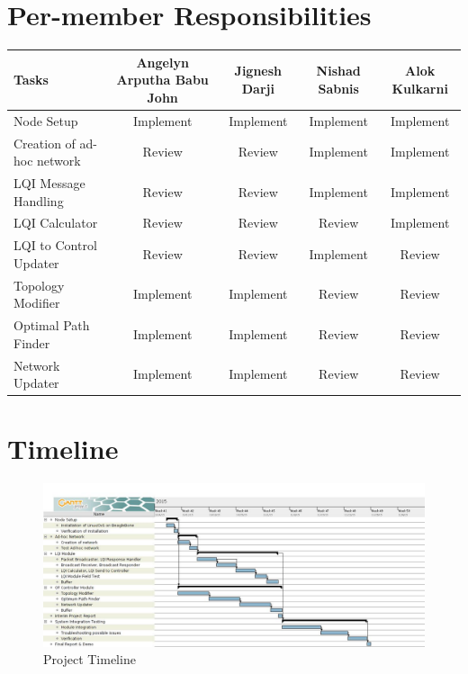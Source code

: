 \documentclass{article}
\begin{document}
\section{Per-member Responsibilities}
\begin{tabular}{  | l | c | c | c | c |}
\hline
\textbf{Tasks}	&	\textbf{Angelyn Arputha Babu John}	&	\textbf{Jignesh Darji}	&	\textbf{Nishad Sabnis}	& \textbf{Alok Kulkarni} \\
\hline \hline
Node Setup	&	Implement	&	Implement	&	Implement	&	Implement \\
Creation of ad-hoc network	&	Review	&	Review	&	Implement	&	Implement \\
LQI Message Handling	&	Review	&	Review	&	Implement	&	Implement \\ 
LQI Calculator	&	Review	&	Review	&	Review	&	Implement\\ 
LQI to Control Updater	&	Review	&	Review	&	Implement	&	Review \\
Topology Modifier	&	Implement	&	Implement	&	Review	&	Review\\
Optimal Path Finder	&	Implement	&	Implement	&	Review	&	Review\\
Network Updater	&	Implement	&	Implement	&	Review	&	Review\\
\hline
\end{tabular}

\section{Timeline}
\begin{figure}[H]
\caption{Project Timeline}
\centering
\includegraphics[width=\textwidth]{timeline}
\end{figure}
\end{document}
